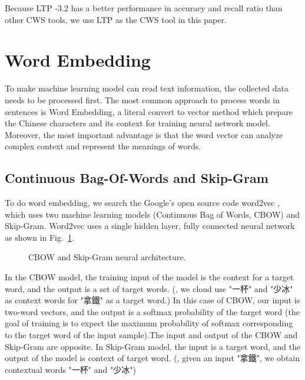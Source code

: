 Because LTP -3.2 has a better performance in accuracy and recall ratio than other CWS tools, we use LTP as the CWS tool in this paper.

\section{Word Embedding} \label{subsubsec:Word Embedding}
To make machine learning model can read text information, the collected data needs to be processed first. The most common approach to process words in sentences is Word Embedding, a literal convert to vector method which prepare the Chinese characters and its context for training neural network model. Moreover, the most important advantage is that the word vector can analyze complex context and represent the meanings of words.

\subsection{Continuous Bag-Of-Words and Skip-Gram}
To do word embedding, we search the Google's open source code word2vec \cite{Word2Vec}, which uses two machine learning models (Continuous Bag of Words, CBOW) and Skip-Gram. Word2vec uses a single hidden layer, fully connected neural network as shown in Fig.~\ref{fig:CbowSkip}.

\begin{figure}[h]
\centerline{}
\caption{CBOW and Skip-Gram neural architecture.}
\label{fig:CbowSkip}
\end{figure}

In the CBOW model, the training input of the model is the context for a target word, and the output is a set of target words. (\eg, we cloud use "一杯" and "少冰" as context words for "拿鐵" as a target word.) In this case of CBOW, our input is two-word vectors, and the output is a softmax probability of the target word (the goal of training is to expect the maximum probability of softmax corresponding to the target word of the input sample).The input and output of the CBOW and Skip-Gram are opposite. In Skip-Gram model, the input is a target word, and the output of the model is context of target word. (\eg, given an input "拿鐵", we obtain contextual words "一杯" and "少冰")


